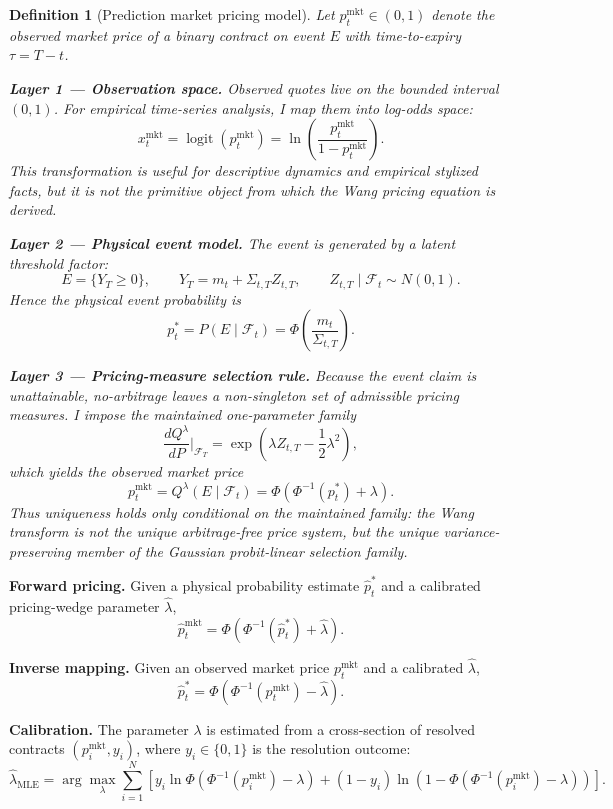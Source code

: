 \documentclass[12pt,a4paper]{article}
\newtheorem{definition}{Definition}
\DeclareMathOperator{\logit}{logit}
\begin{document}
\begin{definition}[Prediction market pricing model]
Let $p_t^{\mathrm{mkt}}\in(0,1)$ denote the observed market price of a binary contract on event $E$ with time-to-expiry $\tau=T-t$.

\textbf{Layer 1 --- Observation space.}
Observed quotes live on the bounded interval $(0,1)$. For empirical time-series analysis, I map them into log-odds space:
\[
x_t^{\mathrm{mkt}}=\logit(p_t^{\mathrm{mkt}})
=\ln\!\left(\frac{p_t^{\mathrm{mkt}}}{1-p_t^{\mathrm{mkt}}}\right).
\]
This transformation is useful for descriptive dynamics and empirical stylized facts, but it is not the primitive object from which the Wang pricing equation is derived.

\textbf{Layer 2 --- Physical event model.}
The event is generated by a latent threshold factor:
\[
E=\{Y_T\ge 0\},
\qquad
Y_T=m_t+\Sigma_{t,T}Z_{t,T},
\qquad
Z_{t,T}\mid\mathcal F_t\sim N(0,1).
\]
Hence the physical event probability is
\[
p_t^*
=
P(E\mid\mathcal F_t)
=
\Phi\!\left(\frac{m_t}{\Sigma_{t,T}}\right).
\]

\textbf{Layer 3 --- Pricing-measure selection rule.}
Because the event claim is unattainable, no-arbitrage leaves a non-singleton set of admissible pricing measures. I impose the maintained one-parameter family
\[
\frac{dQ^\lambda}{dP}\Big|_{\mathcal F_T}
=
\exp\!\left(\lambda Z_{t,T}-\frac{1}{2}\lambda^2\right),
\]
which yields the observed market price
\[
p_t^{\mathrm{mkt}}
=
Q^\lambda(E\mid\mathcal F_t)
=
\Phi\!\left(\Phi^{-1}(p_t^*)+\lambda\right).
\]
Thus uniqueness holds only \emph{conditional on the maintained family}: the Wang transform is not the unique arbitrage-free price system, but the unique variance-preserving member of the Gaussian probit-linear selection family.
\end{definition}

\textbf{Forward pricing.}
Given a physical probability estimate $\hat p_t^*$ and a calibrated pricing-wedge parameter $\hat\lambda$,
\[
\hat p_t^{\mathrm{mkt}}
=
\Phi\!\left(\Phi^{-1}(\hat p_t^*)+\hat\lambda\right).
\]

\textbf{Inverse mapping.}
Given an observed market price $p_t^{\mathrm{mkt}}$ and a calibrated $\hat\lambda$,
\[
\hat p_t^*
=
\Phi\!\left(\Phi^{-1}(p_t^{\mathrm{mkt}})-\hat\lambda\right).
\]

\textbf{Calibration.}
The parameter $\lambda$ is estimated from a cross-section of resolved contracts $(p_i^{\mathrm{mkt}},y_i)$, where $y_i\in\{0,1\}$ is the resolution outcome:
\[
\hat\lambda_{\mathrm{MLE}}
=
\arg\max_\lambda
\sum_{i=1}^N
\left[
y_i\ln \Phi\!\left(\Phi^{-1}(p_i^{\mathrm{mkt}})-\lambda\right)
+
(1-y_i)\ln\!\left(1-\Phi\!\left(\Phi^{-1}(p_i^{\mathrm{mkt}})-\lambda\right)\right)
\right].
\]
\end{document}
